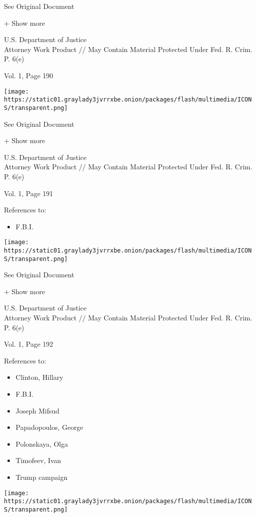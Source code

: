 See Original Document

+ Show more

U.S. Department of Justice\\
Attorney Work Product // May Contain Material Protected Under Fed. R.
Crim. P. 6(e)

Vol. 1, Page 190

\protect\hyperlink{}{}

\texttt{[image: https://static01.graylady3jvrrxbe.onion/packages/flash/multimedia/ICONS/transparent.png]}

See Original Document

+ Show more

U.S. Department of Justice\\
Attorney Work Product // May Contain Material Protected Under Fed. R.
Crim. P. 6(e)

Vol. 1, Page 191

References to:

\begin{itemize}
\tightlist
\item
  F.B.I.
\end{itemize}

\protect\hyperlink{}{}

\texttt{[image: https://static01.graylady3jvrrxbe.onion/packages/flash/multimedia/ICONS/transparent.png]}

See Original Document

+ Show more

U.S. Department of Justice\\
Attorney Work Product // May Contain Material Protected Under Fed. R.
Crim. P. 6(e)

Vol. 1, Page 192

References to:

\begin{itemize}
\tightlist
\item
  Clinton, Hillary
\item
  F.B.I.
\item
  Joseph Mifsud
\item
  Papadopoulos, George
\item
  Polonskaya, Olga
\item
  Timofeev, Ivan
\item
  Trump campaign
\end{itemize}

\protect\hyperlink{}{}

\texttt{[image: https://static01.graylady3jvrrxbe.onion/packages/flash/multimedia/ICONS/transparent.png]}

